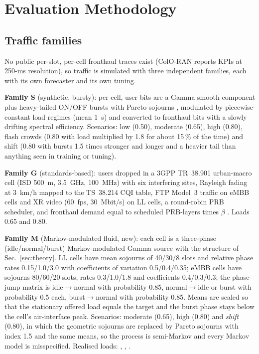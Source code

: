 \documentclass[journal]{IEEEtran}
\begin{document}
\section{Evaluation Methodology}
\label{sec:eval}
\subsection{Traffic families}
\label{sec:families}
No public per-slot, per-cell fronthaul traces exist (ColO-RAN \cite{colo_ran} reports KPIs at 250-ms resolution), so traffic is simulated with three independent families, each with its own forecaster and its own tuning.

\textbf{Family S} (synthetic, bursty): per cell, user bits are a Gamma smooth component plus heavy-tailed ON/OFF bursts with Pareto sojourns \cite{willinger1997}, modulated by piecewise-constant load regimes (mean 1~s) and converted to fronthaul bits with a slowly drifting spectral efficiency. Scenarios: low (0.50), moderate (0.65), high (0.80), flash crowds (0.80 with load multiplied by 1.8 for about 15\,\% of the time) and shift (0.80 with bursts 1.5 times stronger and longer and a heavier tail than anything seen in training or tuning).

\textbf{Family G} (standards-based): users dropped in a 3GPP TR~38.901 urban-macro cell (ISD 500~m, 3.5~GHz, 100~MHz) with six interfering sites, Rayleigh fading at 3~km/h mapped to the TS~38.214 CQI table, FTP Model~3 traffic on eMBB cells and XR video (60~fps, 30~Mbit/s) on LL cells, a round-robin PRB scheduler, and fronthaul demand equal to scheduled PRB-layers times $\beta$ \cite{tr38901,ts38214,tr36814,tr38838}. Loads 0.65 and 0.80.

\textbf{Family M} (Markov-modulated fluid, new): each cell is a three-phase (idle/normal/burst) Markov-modulated Gamma source with the structure of Sec.~\ref{sec:theory}. LL cells have mean sojourns of 40/30/8 slots and relative phase rates 0.15/1.0/3.0 with coefficients of variation 0.5/0.4/0.35; eMBB cells have sojourns 80/60/20 slots, rates 0.3/1.0/1.8 and coefficients 0.4/0.3/0.3; the phase-jump matrix is idle$\to$normal with probability 0.85, normal$\to$idle or burst with probability 0.5 each, burst$\to$normal with probability 0.85. Means are scaled so that the stationary offered load equals the target and the burst phase stays below the cell's air-interface peak. Scenarios: moderate (0.65), high (0.80) and \emph{shift} (0.80), in which the geometric sojourns are replaced by Pareto sojourns with index 1.5 and the same means, so the process is semi-Markov and every Markov model is misspecified. Realised loads: \xloadmmmoderate{}, \xloadmmhigh{}, \xloadmmshift{}.
\end{document}
